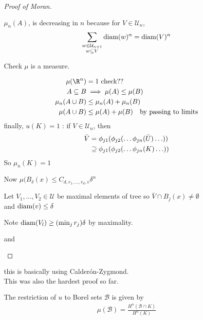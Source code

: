 \begin{proof}[Proof of Moran]
\begin{remark}
	$\mu_n (A)$, is decreasing in $n$ because for $V \in \mathcal{U}_n$,
	\begin{align*}
		\sum_{\substack{w \in \mathcal{U}_{n+1} \\ w \subseteq V}} \operatorname*{diam} (w)^{\alpha} = \operatorname*{diam} (V)^{\alpha}
	\end{align*} 
\end{remark}

Check $\mu$ is a measure.

\begin{align*}
	\mu(\R^{\alpha}) &= 1 \text{   check??} \\
	A \subseteq B &\implies \mu(A) \leq \mu (B) \\
	\mu_{n} (A \cup B ) &\leq \mu_{n} (A) + \mu_{n} (B) \\
	\mu (A \cup B ) &\leq \mu (A) + \mu (B) \quad \text{by passing to limits} \\
\end{align*} 
finally,
$u(K) = 1$ : if $V \in \mathcal{U}_{n}$, then
\begin{align*}
	\bar{V} &= \phi_{j1}( \phi_{j2} ( \ldots \phi_{jn} (\bar{U}) \ldots )) \\
			&\supseteq \phi_{j1}( \phi_{j2} ( \ldots \phi_{jn} (K) \ldots )) \\
\end{align*} So $\mu_n (K) = 1$


Now $\mu (B_{\delta} (x) \leq C_{d,r_{1},\ldots, r_{d}, v} \delta^{\alpha}$ 

Let $V_{1}, \ldots, V_{2} \in \mathcal{U}$ be maximal elements of tree so $\bar{V} \cap B_{j} (x) \neq \emptyset$ \\
and $\operatorname*{diam}(v) \leq \delta$ 


\begin{remark}
	Note $\operatorname*{diam}(V_{l}) \geq (\min_{j} r_{j} ) \delta$ by maximality.

	and 
\end{remark}

\end{proof}


\begin{remark}
	this is basically using Calder\'{o}n-Zygmond. \\
	This was also the hardest proof so far.
\end{remark}

\begin{example}
	The restriction of $u$ to Borel sets $\mathcal{B}$ is given by
	\begin{align*}
		\mu ( \mathcal{B} ) = \frac{H^{\alpha} (\mathcal{B} \cap K)}{H^{\alpha} (K)}
	\end{align*} 
\end{example}

